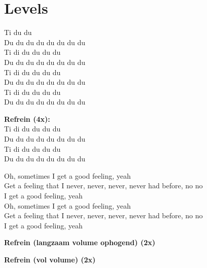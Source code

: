 \section{Levels}
Ti du du\\
Du du du du du du du du\\
Ti di du du du du\\
Du du du du du du du du\\
Ti di du du du du\\
Du du du du du du du du\\
Ti di du du du du\\
Du du du du du du du du

\textbf{Refrein (4x):}\\
Ti di du du du du\\
Du du du du du du du du\\
Ti di du du du du\\
Du du du du du du du du


Oh, sometimes I get a good feeling, yeah\\
Get a feeling that I never, never, never, never had before, no no\\
I get a good feeling, yeah\\
Oh, sometimes I get a good feeling, yeah\\
Get a feeling that I never, never, never, never had before, no no\\
I get a good feeling, yeah

\textbf{Refrein (langzaam volume ophogend) (2x)}

\textbf{Refrein (vol volume) (2x)}
